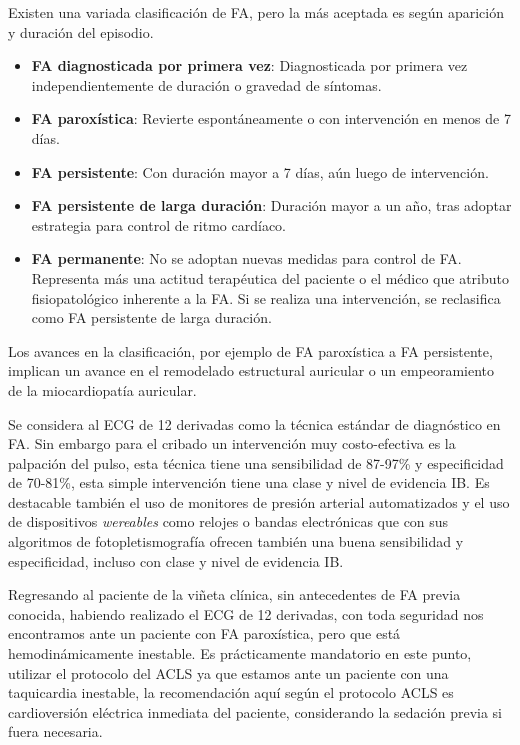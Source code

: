 \documentclass[a4paper]{article}
\let\cite=\supercite
\begin{document}
\begin{multicols}{3}
Existen una variada clasificación de FA, pero la más aceptada es según
aparición y duración del episodio.

\begin{itemize}
    \item \footnotesize{\textbf{FA diagnosticada por primera vez}: Diagnosticada por primera vez independientemente de duración o gravedad de síntomas.}
    \item \textbf{FA paroxística}: Revierte espontáneamente o con intervención en menos de 7 días.
    \item \textbf{FA persistente}: Con duración mayor a 7 días, aún luego de intervención.
		\item \textbf{FA persistente de larga duración}: Duración mayor a un año, tras adoptar estrategia para control de ritmo cardíaco.
		\item \textbf{FA permanente}: No se adoptan nuevas medidas para control de FA. Representa más una actitud terapéutica del paciente o el médico que atributo fisiopatológico inherente a la FA. Si se realiza una intervención, se reclasifica como FA persistente de larga duración.
\end{itemize}

Los avances en la clasificación, por ejemplo de FA paroxística a FA persistente,
implican un avance en el remodelado estructural auricular o un empeoramiento
de la miocardiopatía auricular.

Se considera al ECG de 12 derivadas como la técnica estándar de diagnóstico en
FA\cite{mairesse2017}. Sin embargo para el cribado un intervención muy
costo-efectiva es la palpación del pulso, esta técnica tiene una sensibilidad
de 87-97\% y especificidad de 70-81\%, esta simple intervención tiene una clase
y nivel de evidencia IB. Es destacable también el uso de monitores de presión
arterial automatizados y el uso de dispositivos \emph{wereables} como relojes
o bandas electrónicas que con sus algoritmos de fotopletismografía ofrecen
también una buena sensibilidad y especificidad, incluso con clase y nivel de
evidencia IB\cite{guiaesc_2021}.

Regresando al paciente de la viñeta clínica, sin antecedentes de FA previa
conocida, habiendo realizado el ECG de 12 derivadas, con toda seguridad nos
encontramos ante un paciente con FA paroxística, pero que está
hemodinámicamente inestable. Es prácticamente mandatorio en este punto,
utilizar el protocolo del ACLS ya que estamos ante un paciente con una
taquicardia inestable, la recomendación aquí según el protocolo ACLS es
cardioversión eléctrica inmediata del paciente, considerando la
sedación previa si fuera necesaria\cite{aha2020}.


\end{multicols}
\end{document}
